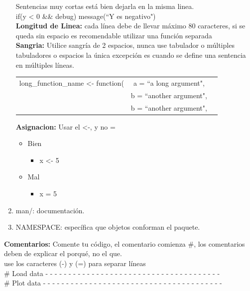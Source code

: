 \begin{enumerate}
Sentencias  muy cortas está bien dejarla en la misma linea.\\
if(y \textless \hspace{1mm} 0 \&\& debug) message(``Y es negativo")\\

\textbf{Longitud de Linea:} cada línea debe de llevar máximo 80 caracteres, si se queda sin espacio es recomendable utilizar una función separada\\

\textbf{Sangria:} Utilice sangría de 2 espacios, nunca use tabulador o múltiples tabuladores o espacios la única excepción es cuando se define una sentencia en múltiples líneas.\\
\begin{tabular}{ccc}
long\_function\_name \textless- function(& a = ``a long argument", \\ 
 &  b = ``another argument", \\
 &  b = ``another argument", \\
\end{tabular}
\newline

\textbf{Asignacion:} Usar el \textless-, y no =
\begin{itemize}
\item Bien  
\begin{itemize}
     \item x \textless- 5
  \end{itemize}
\item Mal
   \begin{itemize}
      \item x = 5
   \end{itemize}
 \end{itemize}

  \item man/: documentación.\\
  \item NAMESPACE: específica que objetos conforman el paquete.\\
\end{enumerate}
\textbf{Comentarios:} Comente tu código, el comentario comienza \#, los comentarios deben de explicar el porqué, no el que.\\ use los caracteres (-) y (=) para separar líneas\\
{\# Load data - - - - - - - - - - - - - - - - - - - - - - - - - - - - - - - - - - - - - -}\\
{\# Plot data - - - - - - - - - - - - - - - - - - - - - - - - - - - - - - - - - - - - - - -}\\


